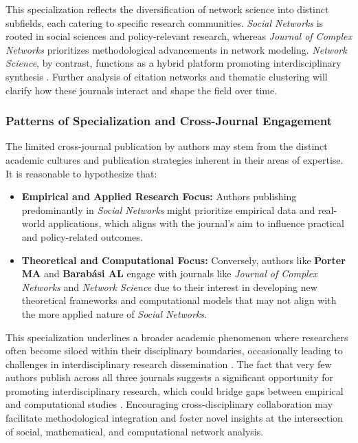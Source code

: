 \documentclass[twocolumn]{article}
\begin{document}
This specialization reflects the diversification of network science into distinct subfields, each catering to specific research communities. \textit{Social Networks} is rooted in social sciences and policy-relevant research, whereas \textit{Journal of Complex Networks} prioritizes methodological advancements in network modeling. \textit{Network Science}, by contrast, functions as a hybrid platform promoting interdisciplinary synthesis \cite{Lazer2009,Borner2020}. Further analysis of citation networks and thematic clustering will clarify how these journals interact and shape the field over time.

	
	\subsubsection*{Patterns of Specialization and Cross-Journal Engagement}
	
	The limited cross-journal publication by authors may stem from the distinct academic cultures and publication strategies inherent in their areas of expertise. It is reasonable to hypothesize that:
	\begin{itemize}
		\item \textbf{Empirical and Applied Research Focus:} Authors publishing predominantly in \textit{Social Networks} might prioritize empirical data and real-world applications, which aligns with the journal's aim to influence practical and policy-related outcomes.
		\item \textbf{Theoretical and Computational Focus:} Conversely, authors like \textbf{Porter MA} and \textbf{Barabási AL} engage with journals like \textit{Journal of Complex Networks} and \textit{Network Science} due to their interest in developing new theoretical frameworks and computational models that may not align with the more applied nature of \textit{Social Networks}.
	\end{itemize}
	
	This specialization underlines a broader academic phenomenon where researchers often become siloed within their disciplinary boundaries, occasionally leading to challenges in interdisciplinary research dissemination \cite{Leahey2016,Porter2009}. The fact that very few authors publish across all three journals suggests a significant opportunity for promoting interdisciplinary research, which could bridge gaps between empirical and computational studies \cite{Wagner2011,Chavarro2017}. Encouraging cross-disciplinary collaboration may facilitate methodological integration and foster novel insights at the intersection of social, mathematical, and computational network analysis.
	
\end{document}
